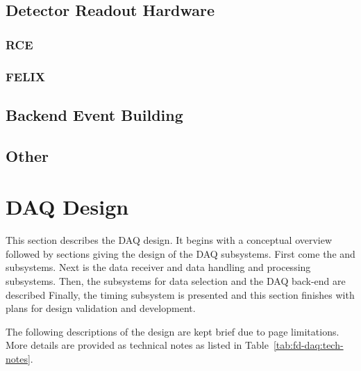 \subsection{Detector Readout Hardware}


\subsubsection{RCE}

\subsubsection{FELIX}

\subsection{Backend Event Building}

\subsection{Other}

\section{DAQ Design}
\label{sec:fd-daq:design}


This section describes the DAQ design. 
It begins with a conceptual overview followed by sections giving the design of the DAQ subsystems. 
First come the  and  subsystems.
Next is the  data receiver and data handling and processing subsystems.
Then, the subsystems for data selection and the DAQ back-end are described Finally, the timing subsystem is presented and this section finishes with plans for design validation and development.


The following descriptions of the design are kept brief due to page limitations. 
More details are provided as technical notes as listed in Table~\ref{tab:fd-daq:tech-notes}.

